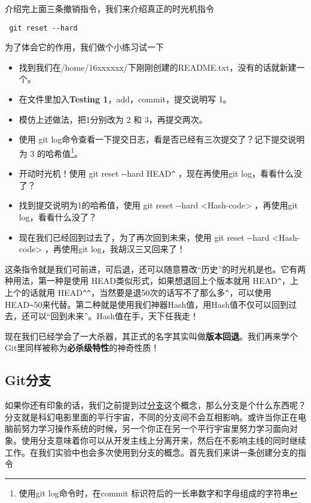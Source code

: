 介绍完上面三条撤销指令，我们来介绍真正的时光机指令

\begin{verbatim}
 git reset --hard
\end{verbatim}

为了体会它的作用，我们做个小练习试一下

\begin{exercise}
	
	\begin{itemize}
		\item 找到我们在/home/16xxxxxx/下刚刚创建的README.txt，没有的话就新建一个。
		\item 在文件里加入\textbf{Testing 1}，add，commit，提交说明写 1。
		\item 模仿上述做法，把1分别改为 2 和 3，再提交两次。
		\item 使用 git log命令查看一下提交日志，看是否已经有三次提交了？记下提交说明为 3 的哈希值\footnote{使用git log命令时，在commit 标识符后的一长串数字和字母组成的字符串}。
		\item 开动时光机！使用 git reset -{}-hard HEAD\verb|^| ，现在再使用git log，看看什么没了？
		\item 找到提交说明为1的哈希值，使用 git reset -{}-hard <Hash-code> ，再使用git log，看看什么没了？
		\item 现在我们已经回到过去了，为了再次回到未来，使用 git reset -{}-hard <Hash-code> ，再使用git log，我胡汉三又回来了！
	\end{itemize}
\end{exercise}

这条指令就是我们可前进，可后退，还可以随意篡改“历史”的时光机是也。它有两种用法，第一种是使用 HEAD类似形式，如果想退回上个版本就用 HEAD\verb|^|，上上个的话就用 HEAD\verb|^|\verb|^|，当然要是退50次的话写不了那么多\verb|^|，可以使用HEAD\verb|~|50来代替。第二种就是使用我们神器Hash值，用Hash值不仅可以回到过去，还可以“回到未来”。Hash值在手，天下任我走！

现在我们已经学会了一大杀器，其正式的名字其实叫做\textbf{版本回退}。我们再来学个Git里同样被称为\textbf{必杀级特性}的神奇性质！

\subsection{Git分支}
如果你还有印象的话，我们之前提到过\hyperref[分支]{分支}这个概念，那么分支是个什么东西呢？分支就是科幻电影里面的平行宇宙，不同的分支间不会互相影响。或许当你正在电脑前努力学习操作系统的时候，另一个你正在另一个平行宇宙里努力学习面向对象。使用分支意味着你可以从开发主线上分离开来，然后在不影响主线的同时继续工作。在我们实验中也会多次使用到分支的概念。首先我们来讲一条创建分支的指令\label{git branch}


